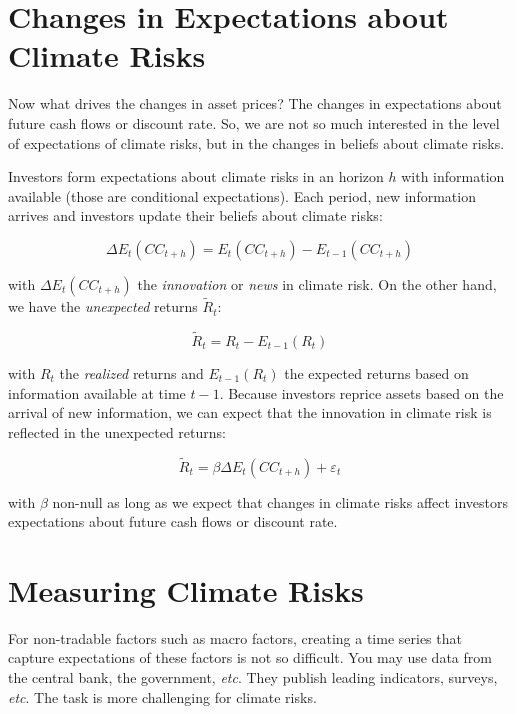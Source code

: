 \section{Changes in Expectations about Climate Risks}

Now what drives the changes in asset prices?
The changes in expectations about 
future cash flows or discount rate. 
So,
we are not so much interested in the level of
expectations of climate risks, but in the changes
in beliefs about climate risks.

Investors form expectations about climate risks
in an horizon $h$ with information available (those 
are conditional expectations).
Each period, new information arrives and investors
update their beliefs about climate risks:

\begin{equation}
    \Delta E_t (CC_{t+h}) = E_t(CC_{t+h}) - E_{t-1}(CC_{t+h})
\end{equation}

with $\Delta E_t (CC_{t+h})$ the \textit{innovation} or 
\textit{news} in climate risk. On the other hand, we have the \textit{unexpected} returns $\tilde{R}_t$:

\begin{equation}
    \tilde{R}_t = R_t - E_{t-1}(R_t)
\end{equation}

with $R_t$ the \textit{realized} returns 
and $E_{t-1}(R_t)$ the expected returns based on information available at time $t-1$.
Because investors reprice assets based on the arrival of new information,
we can expect that the innovation in climate risk is reflected in the unexpected returns:

\begin{equation}
    \tilde{R}_t = \beta \Delta E_t(CC_{t+h}) + \varepsilon_t
\end{equation}


with $\beta$ non-null as long as we expect 
that changes in climate risks affect investors 
expectations about future cash flows or discount rate.


\section{Measuring Climate Risks}

For non-tradable factors such as macro factors, 
creating a time series that capture expectations 
of these factors is not so difficult. You may 
use data from the central bank, the government,
\textit{etc}. They publish leading indicators,
surveys, \textit{etc}. The task is more 
challenging for climate risks.

